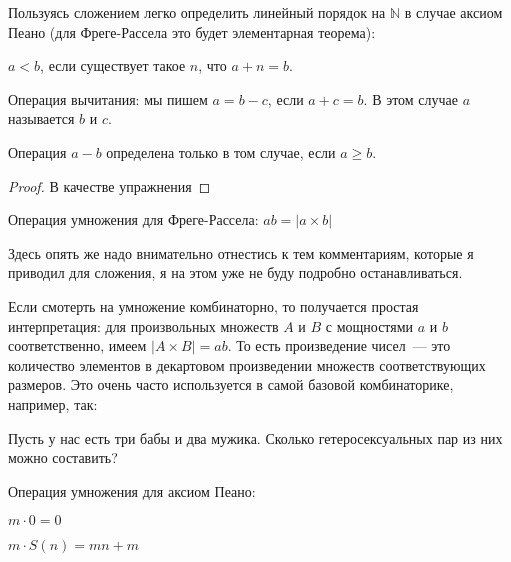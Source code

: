 Пользуясь сложением легко определить линейный порядок на $\mathbb{N}$ в случае аксиом Пеано (для Фреге-Рассела это будет элементарная теорема):

\begin{definition}
$a < b$, если существует такое $n$, что $a + n = b$.
\end{definition}

\begin{definition}
Операция вычитания: мы пишем $a = b - c$, если $a + c = b$. В этом случае $a$ называется  $b$ и $c$.
\end{definition}

\begin{thm}
Операция $a - b$ определена только в том случае, если $a \ge b$.
\end{thm}
\begin{proof}В качестве упражнения\end{proof}

\begin{definition}
Операция умножения для Фреге-Рассела: $ab = |a\times b|$
\end{definition}

Здесь опять же надо внимательно отнестись к тем комментариям, которые я приводил для сложения, я на этом уже не буду подробно останавливаться.

Если смотерть на умножение комбинаторно, то получается простая интерпретация: для произвольных множеств $A$ и $B$ с мощностями $a$ и $b$ соответственно, имеем $|A\times B| = ab$. То есть произведение чисел~--- это количество элементов в декартовом произведении множеств соответствующих размеров. Это очень часто используется в самой базовой комбинаторике, например, так:

\begin{exercise}
Пусть у нас есть три бабы и два мужика. Сколько гетеросексуальных пар из них можно составить?
\end{exercise}

\begin{definition}
Операция умножения для аксиом Пеано:\newline
\item $m\cdot 0 = 0$\newline
\item $m\cdot S(n) = mn + m$
\end{definition}

